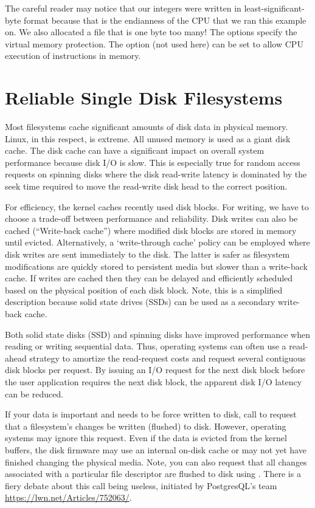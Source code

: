 The careful reader may notice that our integers were written in least-significant-byte format because that is the endianness of the CPU that we ran this example on.
We also allocated a file that is one byte too many! The  options specify the virtual memory protection.
The option  (not used here) can be set to allow CPU execution of instructions in memory.

\section{Reliable Single Disk Filesystems}

Most filesystems cache significant amounts of disk data in physical memory.
Linux, in this respect, is extreme.
All unused memory is used as a giant disk cache.
The disk cache can have a significant impact on overall system performance because disk I/O is slow.
This is especially true for random access requests on spinning disks where the disk read-write latency is dominated by the seek time required to move the read-write disk head to the correct position.

For efficiency, the kernel caches recently used disk blocks.
For writing, we have to choose a trade-off between performance and reliability.
Disk writes can also be cached (``Write-back cache'') where modified disk blocks are stored in memory until evicted.
Alternatively, a `write-through cache' policy can be employed where disk writes are sent immediately to the disk.
The latter is safer as filesystem modifications are quickly stored to persistent media but slower than a write-back cache.
If writes are cached then they can be delayed and efficiently scheduled based on the physical position of each disk block.
Note, this is a simplified description because solid state drives (SSDs) can be used as a secondary write-back cache.

Both solid state disks (SSD) and spinning disks have improved performance when reading or writing sequential data.
Thus, operating systems can often use a read-ahead strategy to amortize the read-request costs and request several contiguous disk blocks per request.
By issuing an I/O request for the next disk block before the user application requires the next disk block, the apparent disk I/O latency can be reduced.

If your data is important and needs to be force written to disk, call  to request that a filesystem's changes be written (flushed) to disk.
However, operating systems may ignore this request.
Even if the data is evicted from the kernel buffers, the disk firmware may use an internal on-disk cache or may not yet have finished changing the physical media.
Note, you can also request that all changes associated with a particular file descriptor are flushed to disk using .
There is a fiery debate about this call being useless, initiated by PostgresQL's team \url{https://lwn.net/Articles/752063/}.

